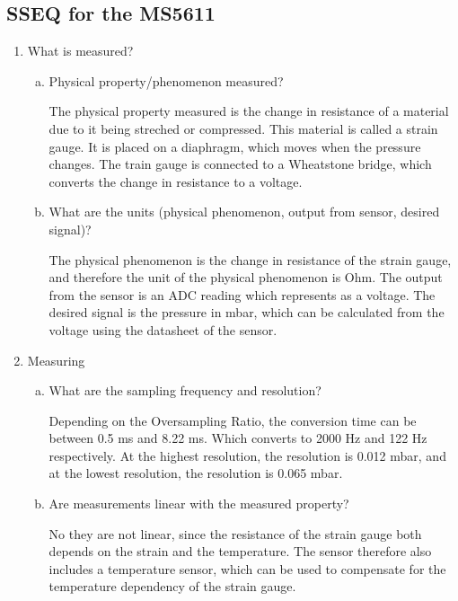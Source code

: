 \subsection{SSEQ for the MS5611}
\begin{enumerate}
    \item What is measured?
    \begin{enumerate}[(a)]
        \item Physical property/phenomenon measured?

        The physical property measured is the change in resistance of a material due to it being streched or compressed.
        This material is called a strain gauge.
        It is placed on a diaphragm, which moves when the pressure changes.
        The train gauge is connected to a Wheatstone bridge, which converts the change in resistance to a voltage.



        \item What are the units (physical phenomenon, output from sensor, desired signal)?

        The physical phenomenon is the change in resistance of the strain gauge, and therefore the unit of the physical phenomenon is Ohm.
        The output from the sensor is an ADC reading which represents as a voltage.
        The desired signal is the pressure in mbar, which can be calculated from the voltage using the datasheet of the sensor.

    \end{enumerate}

    \item Measuring
    \begin{enumerate}[(a)]
        \item What are the sampling frequency and resolution?

        Depending on the Oversampling Ratio, the conversion time can be between 0.5 ms and 8.22 ms.
        Which converts to 2000 Hz and 122 Hz respectively.
        At the highest resolution, the resolution is 0.012 mbar, and at the lowest resolution, the resolution is 0.065 mbar.


        \item Are measurements linear with the measured property?

        No they are not linear, since the resistance of the strain gauge both depends on the strain and the temperature.
        The sensor therefore also includes a temperature sensor, which can be used to compensate for the temperature dependency of the strain gauge. %




\end{enumerate}
\end{enumerate}
